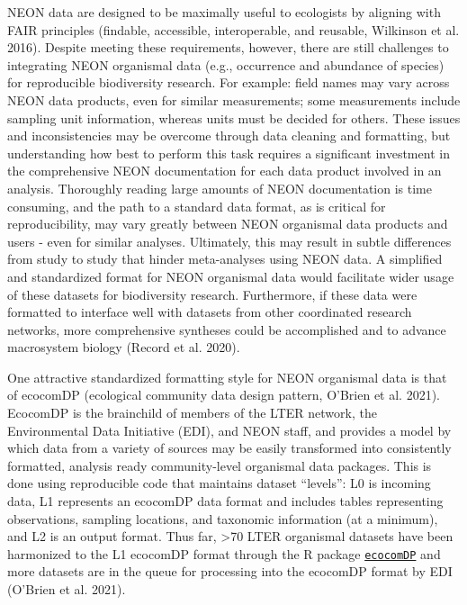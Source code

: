 \documentclass[
  12pt,
]{article}
\begin{document}
NEON data are designed to be maximally useful to ecologists by aligning with FAIR principles (findable, accessible, interoperable, and reusable, Wilkinson et al. 2016). Despite meeting these requirements, however, there are still challenges to integrating NEON organismal data (e.g., occurrence and abundance of species) for reproducible biodiversity research. For example: field names may vary across NEON data products, even for similar measurements; some measurements include sampling unit information, whereas units must be decided for others. These issues and inconsistencies may be overcome through data cleaning and formatting, but understanding how best to perform this task requires a significant investment in the comprehensive NEON documentation for each data product involved in an analysis. Thoroughly reading large amounts of NEON documentation is time consuming, and the path to a standard data format, as is critical for reproducibility, may vary greatly between NEON organismal data products and users - even for similar analyses. Ultimately, this may result in subtle differences from study to study that hinder meta-analyses using NEON data. A simplified and standardized format for NEON organismal data would facilitate wider usage of these datasets for biodiversity research. Furthermore, if these data were formatted to interface well with datasets from other coordinated research networks, more comprehensive syntheses could be accomplished and to advance macrosystem biology (Record et al. 2020).

One attractive standardized formatting style for NEON organismal data is that of ecocomDP (ecological community data design pattern, O'Brien et al. 2021). EcocomDP is the brainchild of members of the LTER network, the Environmental Data Initiative (EDI), and NEON staff, and provides a model by which data from a variety of sources may be easily transformed into consistently formatted, analysis ready community-level organismal data packages. This is done using reproducible code that maintains dataset ``levels'': L0 is incoming data, L1 represents an ecocomDP data format and includes tables representing observations, sampling locations, and taxonomic information (at a minimum), and L2 is an output format. Thus far, \textgreater70 LTER organismal datasets have been harmonized to the L1 ecocomDP format through the R package \href{https://github.com/EDIorg/ecocomDP}{\texttt{ecocomDP}} and more datasets are in the queue for processing into the ecocomDP format by EDI (O'Brien et al. 2021).
\end{document}
